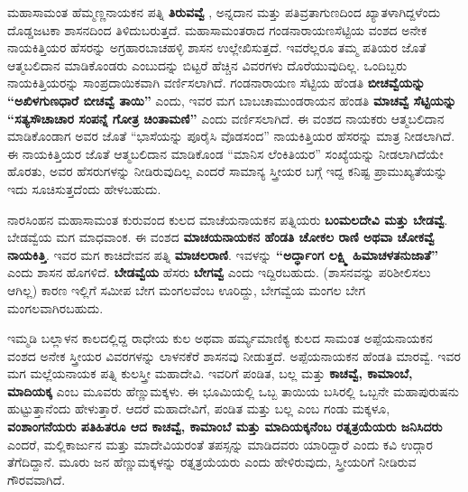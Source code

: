 ಮಹಾಸಾಮಂತ ಹೆಮ್ಮಣ್ಣನಾಯಕನ ಪತ್ನಿ \textbf{ತಿರುವವ್ವೆ }, ಅನ್ನದಾನ ಮತ್ತು ಪತಿವ್ರತಾಗುಣದಿಂದ ಖ್ಯಾತಳಾಗಿದ್ದಳೆಂದು ದೊಡ್ಡಜಟಕಾ ಶಾಸನದಿಂದ ತಿಳಿದುಬರುತ್ತದೆ. ಮಹಾಸಾಮಂತರಾದ ಗಂಡನಾರಾಯಣಸೆಟ್ಟಿಯ ವಂಶದ ಅನೇಕ ನಾಯಕಿತ್ತಿಯರ ಹೆಸರನ್ನು ಅಗ್ರಹಾರಬಾಚಹಳ್ಳಿ ಶಾಸನ ಉಲ್ಲೇಖಿಸುತ್ತದೆ. ಇವರೆಲ್ಲರೂ ತಮ್ಮ ಪತಿಯರ ಜೊತೆ ಆತ್ಮಬಲಿದಾನ ಮಾಡಿಕೊಂಡರು ಎಂಬುದನ್ನು ಬಿಟ್ಟರೆ ಹೆಚ್ಚಿನ ವಿವರಗಳು ದೊರೆಯುವುದಿಲ್ಲ. ಒಂದಿಬ್ಬರು ನಾಯಕಿತ್ತಿಯರನ್ನು ಸಾಂಪ್ರದಾಯಿಕವಾಗಿ ವರ್ಣಿಸಲಾಗಿದೆ. ಗಂಡನಾರಾಯಣ ಸೆಟ್ಟಿಯ ಹೆಂಡತಿ \textbf{ಬೀಚವ್ವೆಯನ್ನು “ಅಖಿಳಗುಣಧಾರೆ ಬೀಚವ್ವೆ ತಾಯಿ”} ಎಂದು, ಇವರ ಮಗ ಬಾಬಚಾಮುಂಡರಾಯನ ಹೆಂಡತಿ \textbf{ಮಾಚವ್ವೆ ಸೆಟ್ಟಿಯನ್ನು “ಸತ್ಯಸೌಚಾಚಾರ ಸಂಪನ್ನೆ ಗೋತ್ರ ಚಿಂತಾಮಣಿ”} ಎಂದು ವರ್ಣಿಸಲಾಗಿದೆ. ಈ ವಂಶದ ನಾಯಕರು ಆತ್ಮಬಲಿದಾನ ಮಾಡಿಕೊಂಡಾಗ ಅವರ ಜೊತೆ “ಭಾಸೆಯನ್ನು ಪೂರೈಸಿ ವೊಡಸಂದ” ನಾಯಕಿತ್ತಿಯರ ಹೆಸರನ್ನು ಮಾತ್ರ ನೀಡಲಾಗಿದೆ. ಈ ನಾಯಕಿತ್ತಿಯರ ಜೊತೆ ಆತ್ಮಬಲಿದಾನ ಮಾಡಿಕೊಂಡ “ಮಾನಿಸ ಲೆಂಕಿತಿಯರ” ಸಂಖ್ಯೆಯನ್ನು ನೀಡಲಾಗಿದೆಯೇ ಹೊರತು, ಅವರ ಹೆಸರುಗಳನ್ನು ನೀಡಿರುವುದಿಲ್ಲ ಎಂದರೆ ಸಾಮಾನ್ಯ ಸ್ತ್ರೀಯರ ಬಗ್ಗೆ ಇದ್ದ ಕನಿಷ್ಟ ಪ್ರಾಮುಖ್ಯತೆಯನ್ನು ಇದು ಸೂಚಿಸುತ್ತದೆಂದು ಹೇಳಬಹುದು.

ನಾರಸಿಂಹನ ಮಹಾಸಾಮಂತ ಕುರುವಂದ ಕುಲದ ಮಾಚೆಯನಾಯಕನ ಪತ್ನಿಯರು \textbf{ಬಂಮಲದೇವಿ ಮತ್ತು ಬೇಡವ್ವೆ}. ಬೇಡವ್ವೆಯ ಮಗ ಮಾಧವಾಂಕ. ಈ ವಂಶದ \textbf{ಮಾಚಯನಾಯಕನ ಹೆಂಡತಿ ಚೋಕಲ ರಾಣಿ ಅಥವಾ ಚೋಕವ್ವೆ ನಾಯಕಿತ್ತಿ}. ಇವರ ಮಗ ಕಾಚಿದೇವನ ಪತ್ನಿ \textbf{ಮಾಚಲರಾಣಿ}. ಇವಳನ್ನು \textbf{“ಅರ್ದ್ಧಾಂಗ ಲಕ್ಷ್ಮಿ ಹಿಮಾಚಳತನುಜಾತೆ”} ಎಂದು ಶಾಸನ ಹೊಗಳಿದೆ. \textbf{ಬೇಡವ್ವೆಯ} ಹೆಸರು \textbf{ಬೇಗವ್ವೆ} ಎಂದು ಇದ್ದಿರಬಹುದು. (ಶಾಸನವನ್ನು ಪರಿಶೀಲಿಸಲು ಆಗಿಲ್ಲ) ಕಾರಣ ಇಲ್ಲಿಗೆ ಸಮೀಪ ಬೇಗ ಮಂಗಲವೆಂಬ ಊರಿದ್ದು, ಬೇಗವ್ವೆಯ ಮಂಗಲ ಬೇಗ ಮಂಗಲವಾಗಿರಬಹುದು.

ಇಮ್ಮಡಿ ಬಲ್ಲಾಳನ ಕಾಲದಲ್ಲಿದ್ದ ರಾಧೇಯ ಕುಲ ಅಥವಾ ಹರ್ಮ್ಯಮಾಣಿಕ್ಯ ಕುಲದ ಸಾಮಂತ ಅಪ್ಪೆಯನಾಯಕನ ವಂಶದ ಅನೇಕ ಸ್ತ್ರೀಯರ ವಿವರಗಳನ್ನು ಲಾಳನಕೆರೆ ಶಾಸನವು ನೀಡುತ್ತದೆ. ಅಪ್ಪೆಯನಾಯಕನ ಹೆಂಡತಿ ಮಾರವ್ವೆ. ಇವರ ಮಗ ಮಲ್ಲೆಯನಾಯಕ ಪತ್ನಿ ಕುಲಸ್ತ್ರೀ ಮಹಾದೇವಿ. ಇವರಿಗೆ ಪಂಡಿತ, ಬಲ್ಲ ಮತ್ತು \textbf{ಕಾಚವ್ವೆ, ಕಾಮಾಂಬೆ, ಮಾದಿಯಕ್ಕ} ಎಂಬ ಮೂವರು ಹೆಣ್ಣುಮಕ್ಕಳು. ಈ ಭೂಮಿಯಲ್ಲಿ ಒಬ್ಬ ತಾಯಿಯ ಬಸಿರಲ್ಲಿ ಒಬ್ಬನೇ ಮಹಾಪುರುಷನು ಹುಟ್ಟುತ್ತಾನೆಂದು ಹೇಳುತ್ತಾರೆ. ಆದರೆ ಮಹಾದೇವಿಗೆ, ಪಂಡಿತ ಮತ್ತು ಬಲ್ಲ ಎಂಬ ಗಂಡು ಮಕ್ಕಳೂ, \textbf{ವಂಶಾಂಗನೆಯರು ಪತಿಹಿತರೂ ಆದ ಕಾಚವ್ವೆ, ಕಾಮಾಂಬೆ ಮತ್ತು ಮಾದಿಯಕ್ಕನೆಂಬ ರತ್ನತ್ರಯೆಯರು ಜನಿಸಿದರು} ಎಂದರೆ, ಮಲ್ಲಿಕಾರ್ಜುನ ಮತ್ತು ಮಾದೇವಿಯರಂತೆ ತಪಸ್ಸನ್ನು ಮಾಡಿದವರು ಯಾರಿದ್ದಾರೆ ಎಂದು ಕವಿ ಉದ್ಗಾರ ತೆಗೆದಿದ್ದಾನೆ. ಮೂರು ಜನ ಹೆಣ್ಣುಮಕ್ಕಳನ್ನು ರತ್ನತ್ರಯೆಯರು ಎಂದು ಹೇಳಿರುವುದು, ಸ್ತ್ರೀಯರಿಗೆ ನೀಡಿರುವ ಗೌರವವಾಗಿದೆ.

